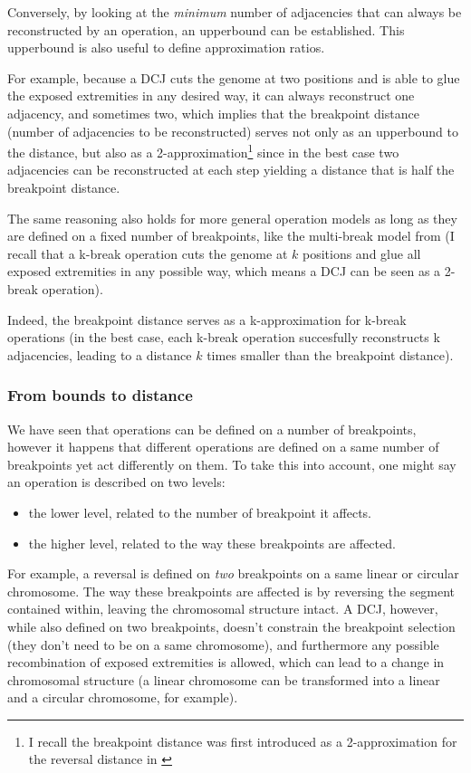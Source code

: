 \documentclass[11pt,final,twoside,nofrench]{thlifl}
\begin{document}
Conversely, by looking at the \emph{minimum} number of adjacencies that can always be reconstructed by an operation, an upperbound can be established. This upperbound is also useful to define approximation ratios.

For example, because a DCJ cuts the genome at two positions and is able to glue the exposed extremities in any desired way, it can always reconstruct one adjacency, and sometimes two, which implies that the breakpoint distance (number of adjacencies to be reconstructed) serves not only as an upperbound to the distance, but also as a 2-approximation\footnote{I recall the breakpoint distance was first introduced as a 2-approximation for the reversal distance in \cite{KS93}} since in the best case two adjacencies can be reconstructed at each step yielding a distance that is half the breakpoint distance.

The same reasoning also holds for more general operation models as long as they are defined on a fixed number of breakpoints, like the multi-break model from \cite{A08} (I recall that a k-break operation cuts the genome at $k$ positions and glue all exposed extremities in any possible way, which means a DCJ can be seen as a 2-break operation).

Indeed, the breakpoint distance serves as a k-approximation for k-break operations (in the best case, each k-break operation succesfully reconstructs k adjacencies, leading to a distance $k$ times smaller than the breakpoint distance).

\subsubsection{From bounds to distance}

We have seen that operations can be defined on a number of breakpoints, however it happens that different operations are defined on a same number of breakpoints yet act differently on them. To take this into account, one might say an operation is described on two levels:

\begin{itemize}
\item the lower level, related to the number of breakpoint it affects.
\item the higher level, related to the way these breakpoints are affected.
\end{itemize}

For example, a reversal is defined on \emph{two} breakpoints on a same linear or circular chromosome. The way these breakpoints are affected is by reversing the segment contained within, leaving the chromosomal structure intact.
A DCJ, however, while also defined on two breakpoints, doesn't constrain the breakpoint selection (they don't need to be on a same chromosome), and furthermore any possible recombination of exposed extremities is allowed, which can lead to a change in chromosomal structure (a linear chromosome can be transformed into a linear and a circular chromosome, for example).
\end{document}
